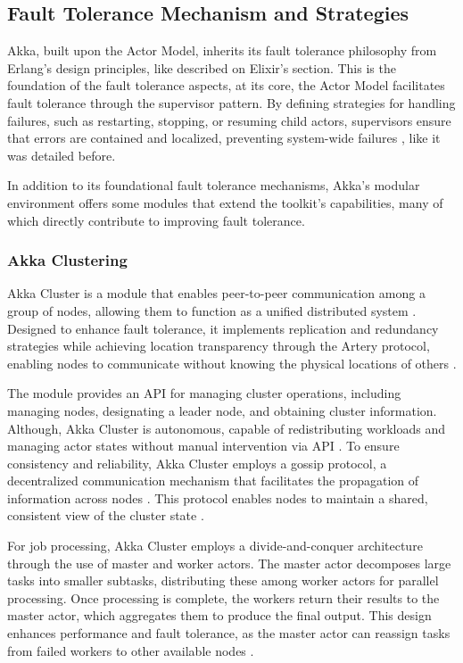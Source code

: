 \subsection{Fault Tolerance Mechanism and Strategies}

Akka, built upon the Actor Model, inherits its fault tolerance philosophy from Erlang’s design principles, like described on Elixir's section. This is the foundation of the fault tolerance aspects, at its core, the Actor Model facilitates fault tolerance through the supervisor pattern. By defining strategies for handling failures, such as restarting, stopping, or resuming child actors, supervisors ensure that errors are contained and localized, preventing system-wide failures \cite{akka-docs,Abraham2023,Juric2024}, like it was detailed before.

In addition to its foundational fault tolerance mechanisms, Akka’s modular environment offers some modules that extend the toolkit’s capabilities, many of which directly contribute to improving fault tolerance.

\subsubsection{Akka Clustering}

Akka Cluster is a module that enables peer-to-peer communication among a group of nodes, allowing them to function as a unified distributed system \cite{Moradi2023,akka-docs}. Designed to enhance fault tolerance, it implements replication and redundancy strategies while achieving location transparency through the Artery protocol, enabling nodes to communicate without knowing the physical locations of others \cite{Abraham2023}.

The module provides an API for managing cluster operations, including managing nodes, designating a leader node, and obtaining cluster information. Although, Akka Cluster is autonomous, capable of redistributing workloads and managing actor states without manual intervention via API \cite{Abraham2023}. To ensure consistency and reliability, Akka Cluster employs a gossip protocol, a decentralized communication mechanism that facilitates the propagation of information across nodes \cite{Tanenbaum2023,akka-docs}. This protocol enables nodes to maintain a shared, consistent view of the cluster state \cite{Tanenbaum2023}.

For job processing, Akka Cluster employs a divide-and-conquer architecture through the use of master and worker actors. The master actor decomposes large tasks into smaller subtasks, distributing these among worker actors for parallel processing. Once processing is complete, the workers return their results to the master actor, which aggregates them to produce the final output. This design enhances performance and fault tolerance, as the master actor can reassign tasks from failed workers to other available nodes \cite{akka-docs}.

